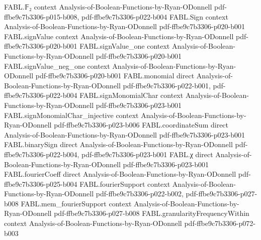 \begin{theorem}
\label{FABL.tribesCriticalProbabilityDeficit_isBigO_log_dimension_div_dimension}
\leanok
{}
\proofstep
  {FABL.𝔽₂}
  {context}
  {Analysis-of-Boolean-Functions-by-Ryan-ODonnell}
  {pdf-ffbe9c7b3306-p015-b008,
    pdf-ffbe9c7b3306-p022-b004}
\proofstep
  {FABL.Sign}
  {context}
  {Analysis-of-Boolean-Functions-by-Ryan-ODonnell}
  {pdf-ffbe9c7b3306-p020-b001}
\proofstep
  {FABL.signValue}
  {context}
  {Analysis-of-Boolean-Functions-by-Ryan-ODonnell}
  {pdf-ffbe9c7b3306-p020-b001}
\proofstep
  {FABL.signValue_one}
  {context}
  {Analysis-of-Boolean-Functions-by-Ryan-ODonnell}
  {pdf-ffbe9c7b3306-p020-b001}
\proofstep
  {FABL.signValue_neg_one}
  {context}
  {Analysis-of-Boolean-Functions-by-Ryan-ODonnell}
  {pdf-ffbe9c7b3306-p020-b001}
\proofstep
  {FABL.monomial}
  {direct}
  {Analysis-of-Boolean-Functions-by-Ryan-ODonnell}
  {pdf-ffbe9c7b3306-p022-b001,
    pdf-ffbe9c7b3306-p022-b004}
\proofstep
  {FABL.signMonomialChar}
  {context}
  {Analysis-of-Boolean-Functions-by-Ryan-ODonnell}
  {pdf-ffbe9c7b3306-p023-b001}
\proofstep
  {FABL.signMonomialChar_injective}
  {context}
  {Analysis-of-Boolean-Functions-by-Ryan-ODonnell}
  {pdf-ffbe9c7b3306-p023-b006}
\proofstep
  {FABL.coordinateSum}
  {direct}
  {Analysis-of-Boolean-Functions-by-Ryan-ODonnell}
  {pdf-ffbe9c7b3306-p023-b001}
\proofstep
  {FABL.binarySign}
  {direct}
  {Analysis-of-Boolean-Functions-by-Ryan-ODonnell}
  {pdf-ffbe9c7b3306-p022-b004,
    pdf-ffbe9c7b3306-p023-b001}
\proofstep
  {FABL.χ}
  {direct}
  {Analysis-of-Boolean-Functions-by-Ryan-ODonnell}
  {pdf-ffbe9c7b3306-p023-b001}
\proofstep
  {FABL.fourierCoeff}
  {direct}
  {Analysis-of-Boolean-Functions-by-Ryan-ODonnell}
  {pdf-ffbe9c7b3306-p025-b004}
\proofstep
  {FABL.fourierSupport}
  {context}
  {Analysis-of-Boolean-Functions-by-Ryan-ODonnell}
  {pdf-ffbe9c7b3306-p022-b002,
    pdf-ffbe9c7b3306-p027-b008}
\proofstep
  {FABL.mem_fourierSupport}
  {context}
  {Analysis-of-Boolean-Functions-by-Ryan-ODonnell}
  {pdf-ffbe9c7b3306-p027-b008}
\proofstep
  {FABL.granularityFrequencyWithin}
  {context}
  {Analysis-of-Boolean-Functions-by-Ryan-ODonnell}
  {pdf-ffbe9c7b3306-p072-b003}

\end{theorem}
